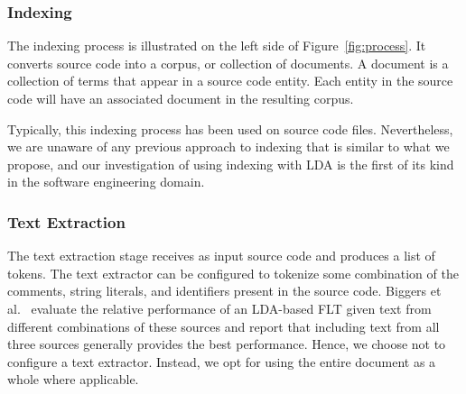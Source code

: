     \subsubsection{Indexing}
    The indexing process is illustrated on the left side of Figure~\ref{fig:process}.
    It converts source code into a corpus, or collection of documents.
    A document is a collection of terms that appear in a source code entity.
    Each entity in the source code will have an associated document in the resulting corpus.

    Typically, this indexing process has been used on source code files\needcite.
    Nevertheless, we are unaware of any previous approach to indexing that is similar to what we propose,
    and our investigation of using indexing with LDA is the first of its kind in the software engineering domain.

    \subsubsection{Text Extraction}
    The text extraction stage receives as input source code and produces a list of tokens.
    The text extractor can be configured to tokenize some combination of
    the comments, string literals, and identifiers present in the source code.
    Biggers et al.~\cite{Biggers2010} evaluate the relative performance of an LDA-based FLT
    given text from different combinations of these sources
    and report that including text from all three sources generally provides the best performance.
    Hence, we choose not to configure a text extractor.
    Instead, we opt for using the entire document as a whole where applicable.

